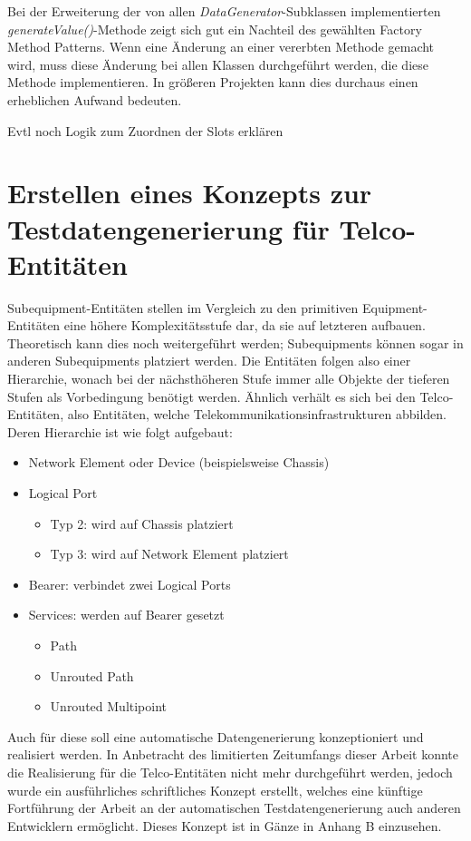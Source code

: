Bei der Erweiterung der von allen \textit{DataGenerator}-Subklassen implementierten \textit{generateValue()}-Methode zeigt sich gut ein Nachteil des gewählten Factory Method Patterns. Wenn eine Änderung an einer vererbten Methode gemacht wird, muss diese Änderung bei allen Klassen durchgeführt werden, die diese Methode implementieren. In größeren Projekten kann dies durchaus einen erheblichen Aufwand bedeuten. 

Evtl noch Logik zum Zuordnen der Slots erklären

\section{Erstellen eines Konzepts zur Testdatengenerierung für Telco-Entitäten}\label{sec:tdgtelco}
Subequipment-Entitäten stellen im Vergleich zu den primitiven Equipment-Entitäten eine höhere Komplexitätsstufe dar, da sie auf letzteren aufbauen. Theoretisch kann dies noch weitergeführt werden; Subequipments können sogar in anderen Subequipments platziert werden. Die Entitäten folgen also einer Hierarchie, wonach bei der nächsthöheren Stufe immer alle Objekte der tieferen Stufen als Vorbedingung benötigt werden. Ähnlich verhält es sich bei den Telco-Entitäten, also Entitäten, welche Telekommunikationsinfrastrukturen abbilden. Deren Hierarchie ist wie folgt aufgebaut:

\begin{itemize}
    \item Network Element oder Device (beispielsweise Chassis)
    \item Logical Port
    \begin{itemize}
        \item Typ 2: wird auf Chassis platziert
        \item Typ 3: wird auf Network Element platziert
    \end{itemize}
    \item Bearer: verbindet zwei Logical Ports
    \item Services: werden auf Bearer gesetzt
    \begin{itemize}
        \item Path
        \item Unrouted Path
        \item Unrouted Multipoint
    \end{itemize}
\end{itemize}

Auch für diese soll eine automatische Datengenerierung konzeptioniert und realisiert werden. In Anbetracht des limitierten Zeitumfangs dieser Arbeit konnte die Realisierung für die Telco-Entitäten nicht mehr durchgeführt werden, jedoch wurde ein ausführliches schriftliches Konzept erstellt, welches eine künftige Fortführung der Arbeit an der automatischen Testdatengenerierung auch anderen Entwicklern ermöglicht. Dieses Konzept ist in Gänze in Anhang B einzusehen.